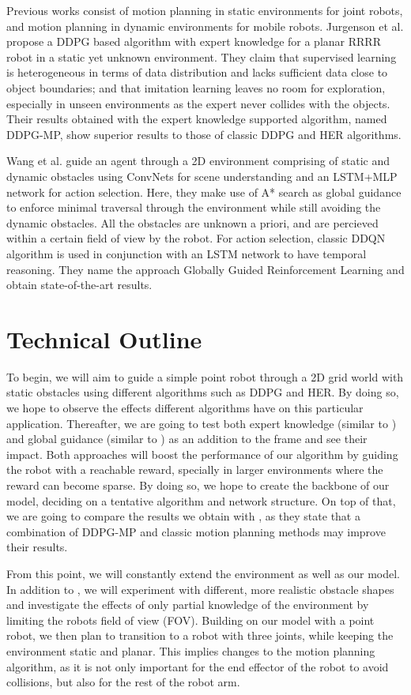 \documentclass[conference]{IEEEtran}
\begin{document}
Previous works consist of motion planning in static environments for joint robots, and motion planning in dynamic environments for mobile robots. Jurgenson et al. \cite{b1} propose a DDPG based algorithm with expert knowledge for a planar RRRR robot in a static yet unknown environment. They claim that supervised learning is heterogeneous in terms of data distribution and lacks sufficient data close to object boundaries; and that imitation learning leaves no room for exploration, especially in unseen environments as the expert never collides with the objects. Their results obtained with the expert knowledge supported algorithm, named DDPG-MP, show superior results to those of classic DDPG and HER algorithms.

Wang et al. \cite{b2} guide an agent through a 2D environment comprising of static and dynamic obstacles using ConvNets for scene understanding and an LSTM+MLP network for action selection. Here, they make use of A* search as global guidance to enforce minimal traversal through the environment while still avoiding the dynamic obstacles. All the obstacles are unknown a priori, and are percieved within a certain field of view by the robot. For action selection, classic DDQN algorithm is used in conjunction with an LSTM network to have temporal reasoning. They name the approach Globally Guided Reinforcement Learning and obtain state-of-the-art results. 

\section{Technical Outline} To begin, we will aim to guide a simple point robot through a 2D grid world with static obstacles using different algorithms such as DDPG and HER. By doing so, we hope to observe the effects different algorithms have on this particular application. Thereafter, we are going to test both expert knowledge (similar to \cite{b1}) and global guidance (similar to \cite{b2}) as an addition to the frame and see their impact. Both approaches will boost the performance of our algorithm by guiding the robot with a reachable reward, specially in larger environments where the reward can become sparse. By doing so, we hope to create the backbone of our model, deciding on a tentative algorithm and network structure. On top of that, we are going to compare the results we obtain with \cite{b1}, as they state that a combination of DDPG-MP and classic motion planning methods may improve their results.  

From this point, we will constantly extend the environment as well as our model. In addition to \cite{b1}, we will experiment with different, more realistic obstacle shapes and investigate the effects of only partial knowledge of the environment by limiting the robots field of view (FOV). Building on our model with a point robot, we then plan to transition to a robot with three joints, while keeping the environment static and planar. This implies changes to the motion planning algorithm, as it is not only important for the end effector of the robot to avoid collisions, but also for the rest of the robot arm.
\end{document}
